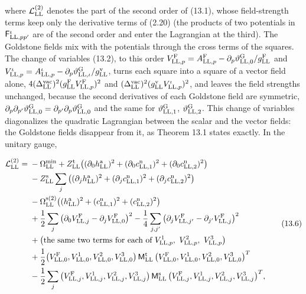 \documentclass[
  10pt,
]{article}
\begin{document}
where \(\mathcal L^{(2)}_{\rm LL}\) denotes the part of the second order
of (13.1), whose field-strength terms keep only the derivative terms of
(2.20) (the products of two potentials in
\(\mathsf F^\iota_{{\rm LL},pp'}\) are of the second order and enter the
Lagrangian at the third). The Goldstone fields mix with the potentials
through the cross terms of the squares. The change of variables (13.2),
to this order
\(V^{\rm F}_{{\rm LL},p}=A^{\rm F}_{{\rm LL},p}-\partial_p\vartheta^{\rm G}_{{\rm LL},0}/g^{\rm F}_{\rm LL}\)
and
\(V^\iota_{{\rm LL},p}=A^\iota_{{\rm LL},p}-\partial_p\vartheta^{\rm G}_{{\rm LL},\iota}/g^{\rm v}_{\rm LL}\),
turns each square into a square of a vector field alone,
\(4(\Delta^{\rm vac}_{\rm LL})^2(g^{\rm F}_{\rm LL}V^{\rm F}_{{\rm LL},p})^2\)
and
\((\Delta^{\rm vac}_{\rm LL})^2(g^{\rm v}_{\rm LL}V^\iota_{{\rm LL},p})^2\),
and leaves the field strengths unchanged, because the second derivatives
of each Goldstone field are symmetric,
\(\partial_p\partial_{p'}\vartheta^{\rm G}_{{\rm LL},0}=\partial_{p'}\partial_p\vartheta^{\rm G}_{{\rm LL},0}\)
and the same for \(\vartheta^{\rm G}_{{\rm LL},1}\),
\(\vartheta^{\rm G}_{{\rm LL},2}\). This change of variables
diagonalizes the quadratic Lagrangian between the scalar and the vector
fields: the Goldstone fields disappear from it, as Theorem 13.1 states
exactly. In the unitary gauge,

\[\begin{aligned}\mathcal L^{(2)}_{\rm LL}={}&-\Omega^{\rm min}_{\rm LL}+Z^{\rm t}_{\rm LL}\big((\partial_0h^{\rm a}_{\rm LL})^2+(\partial_0c^{\rm n}_{{\rm LL},1})^2+(\partial_0c^{\rm n}_{{\rm LL},2})^2\big)\\&-Z^{\rm s}_{\rm LL}\sum_j\big((\partial_jh^{\rm a}_{\rm LL})^2+(\partial_jc^{\rm n}_{{\rm LL},1})^2+(\partial_jc^{\rm n}_{{\rm LL},2})^2\big)\\&-\Omega^{\rm s(2)}_{\rm LL}\big((h^{\rm a}_{\rm LL})^2+(c^{\rm n}_{{\rm LL},1})^2+(c^{\rm n}_{{\rm LL},2})^2\big)\\&+\frac12\sum_j\big(\partial_0V^{\rm F}_{{\rm LL},j}-\partial_jV^{\rm F}_{{\rm LL},0}\big)^2-\frac14\sum_{j,j'}\big(\partial_jV^{\rm F}_{{\rm LL},j'}-\partial_{j'}V^{\rm F}_{{\rm LL},j}\big)^2\\&+\big(\text{the same two terms for each of }V^1_{{\rm LL},p},\ V^2_{{\rm LL},p},\ V^3_{{\rm LL},p}\big)\\&+\frac12\big(V^{\rm F}_{{\rm LL},0},V^1_{{\rm LL},0},V^2_{{\rm LL},0},V^3_{{\rm LL},0}\big)\,\mathsf M^{\rm t}_{\rm LL}\,\big(V^{\rm F}_{{\rm LL},0},V^1_{{\rm LL},0},V^2_{{\rm LL},0},V^3_{{\rm LL},0}\big)^T\\&-\frac12\sum_j\big(V^{\rm F}_{{\rm LL},j},V^1_{{\rm LL},j},V^2_{{\rm LL},j},V^3_{{\rm LL},j}\big)\,\mathsf M^{\rm s}_{\rm LL}\,\big(V^{\rm F}_{{\rm LL},j},V^1_{{\rm LL},j},V^2_{{\rm LL},j},V^3_{{\rm LL},j}\big)^T,\end{aligned}\tag{13.6}\]
\end{document}
